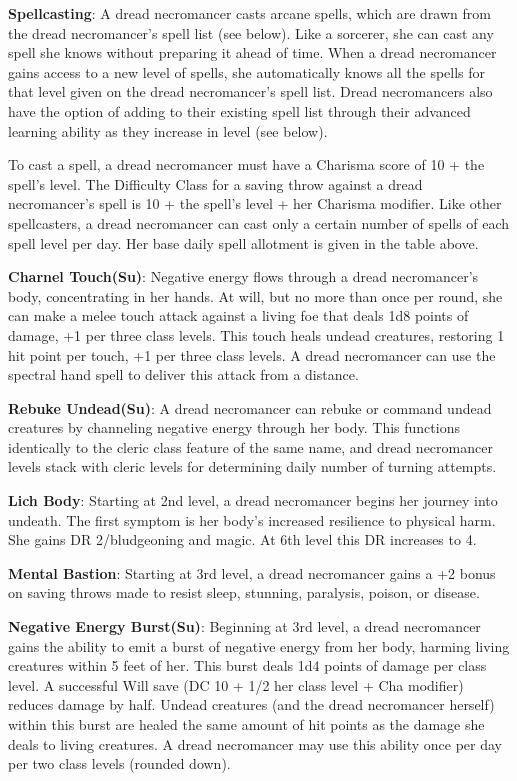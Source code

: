 \textbf{Spellcasting}: A dread necromancer casts arcane spells, which are drawn from the dread necromancer's spell list (see below). Like a sorcerer, she can cast any spell she knows without preparing it ahead of time. When a dread necromancer gains access to a new level of spells, she automatically knows all the spells for that level given on the dread necromancer's spell list. Dread necromancers also have the option of adding to their existing spell list through their advanced learning ability as they increase in level (see below).

To cast a spell, a dread necromancer must have a Charisma score of 10 + the spell's level. The Difficulty Class for a saving throw against a dread necromancer's spell is 10 + the spell's level + her Charisma modifier. Like other spellcasters, a dread necromancer can cast only a certain number of spells of each spell level per day. Her base daily spell allotment is given in the table above.

\textbf{Charnel Touch(Su)}: Negative energy flows through a dread necromancer's body, concentrating in her hands. At will, but no more than once per round, she can make a melee touch attack against a living foe that deals 1d8 points of damage, +1 per three class levels. This touch heals undead creatures, restoring 1 hit point per touch, +1 per three class levels. A dread necromancer can use the spectral hand spell to deliver this attack from a distance.

\textbf{Rebuke Undead(Su)}: A dread necromancer can rebuke or command undead creatures by channeling negative energy through her body. This functions identically to the cleric class feature of the same name, and dread necromancer levels stack with cleric levels for determining daily number of turning attempts.

\textbf{Lich Body}: Starting at 2nd level, a dread necromancer begins her journey into undeath. The first symptom is her body's increased resilience to physical harm. She gains DR 2/bludgeoning and magic. At 6th level this DR increases to 4.

\textbf{Mental Bastion}: Starting at 3rd level, a dread necromancer gains a +2 bonus on saving throws made to resist sleep, stunning, paralysis, poison, or disease.

\textbf{Negative Energy Burst(Su)}: Beginning at 3rd level, a dread necromancer gains the ability to emit a burst of negative energy from her body, harming living creatures within 5 feet of her. This burst deals 1d4 points of damage per class level. A successful Will save (DC 10 + 1/2 her class level + Cha modifier) reduces damage by half. Undead creatures (and the dread necromancer herself) within this burst are healed the same amount of hit points as the damage she deals to living creatures. A dread necromancer may use this ability once per day per two class levels (rounded down).

